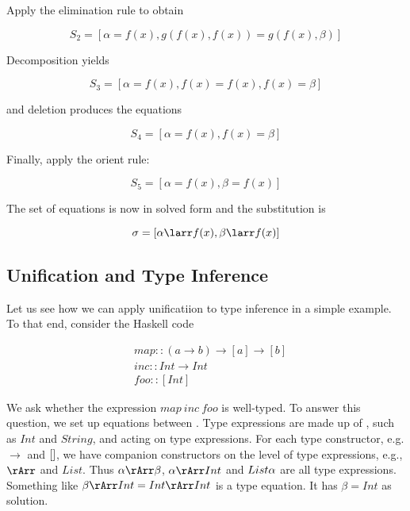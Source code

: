 Apply the elimination rule to obtain 

\begin{equation}
S_2 = [\alpha = f(x), g(f(x), f(x)) = g(f(x), \beta)]
\end{equation}

Decomposition yields

\begin{equation}
S_3 = [\alpha = f(x), f(x) = f(x), f(x) = \beta]
\end{equation}

and deletion produces the equations 

\begin{equation}
S_4 = [\alpha = f(x), f(x) = \beta]
\end{equation}

Finally, apply the orient rule:

\begin{equation}
S_5 = [\alpha = f(x), \beta = f(x)]
\end{equation}

The set of equations is now in solved form and the substitution is 

\begin{equation}
\sigma = [\alpha \larr f(x), \beta \larr f(x)]
\end{equation}

\subsection{Unification and Type Inference}

Let us see how we can apply unificatiion to type inference in a simple example. To that end, consider the Haskell code

\begin{align}
& map :: (a \to b) \to [a] \to [b] \\
& inc :: Int \to Int \\
& foo :: [Int]
\end{align}

We ask whether the expression $map\ inc\ foo$ is well-typed.  To answer this question, we set up equations between  .  Type expressions are made up of ,  such as $Int$ and $String$, and  acting on type expressions.  For each type constructor, e.g. $\to$ and $[\space]$, we have companion constructors on the level of type expressions, e.g., $\rArr$ and $List$.  Thus $\alpha \rArr \beta$, $\alpha \rArr Int$ and $List\space \alpha$  are all type expressions.  Something like $\beta \rArr Int = Int \rArr Int$ is a type equation.  It has $\beta = Int$ as solution.


